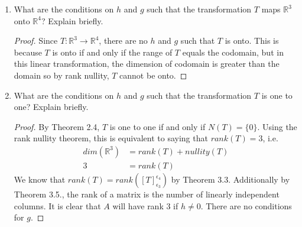 \documentclass[11pt]{scrartcl}
\begin{document}
\begin{enumerate}[label=\alph*.]
{\begin{proof}
$$			      T(e_3)  = \left(\begin{array}{c}0\\2g\\2\\h\end{array}\right)
		      $$
		      \begin{align*}
			      A & = [[T(e_1)]_{\epsilon_4}[T(e_2)]_{\epsilon_4}[T(e_3)]_{\epsilon_4}] \\
			        & = \begin{bmatrix}
				      -1 & 1 & 0  \\
				      1  & 1 & 2g \\
				      1  & 1 & 2  \\
				      0  & 0 & h
			      \end{bmatrix}
		      \end{align*}
	      \end{proof}
	      }
	\item{
	      What are the conditions on $h$ and $g$ such that the transformation $T$ maps $\mathbb{R}^3$
	      onto $\mathbb{R}^4$? Explain briefly.
	      \begin{proof}
		      Since $T : \mathbb{R}^3 \rightarrow \mathbb{R}^4$, there are no $h$ and $g$ such that $T$ is onto.
		      This is because $T$ is onto if and only if the range of $T$ equals the codomain, but in this
		      linear transformation, the dimension of codomain is greater than the domain so by rank nullity,
		      $T$ cannot be onto.
	      \end{proof}
	      }
	\item{
	      What are the conditions on $h$ and $g$ such that the transformation $T$ is one to one? Explain briefly.
	      \begin{proof}
		      By Theorem 2.4, $T$ is one to one if and only if $N(T) = \{0\}$. Using the rank nullity theorem,
		      this is equivalent to saying that $rank(T) = 3$, i.e.
		      \begin{align*}
			      dim(\mathbb{R}^3) & = rank(T) + nullity(T) \\
			      3                 & = rank(T)
		      \end{align*}
		      We know that $rank(T) = rank([T]_{\epsilon_3}^{\epsilon_4})$ by Theorem 3.3.
		      Additionally by Theorem 3.5., the rank of a matrix is the number of linearly independent columns.
		      It is clear that $A$ will have rank 3 if $h \neq 0 $. There are no conditions for $g$.
	      \end{proof}
	      }

\end{enumerate}
\end{document}
